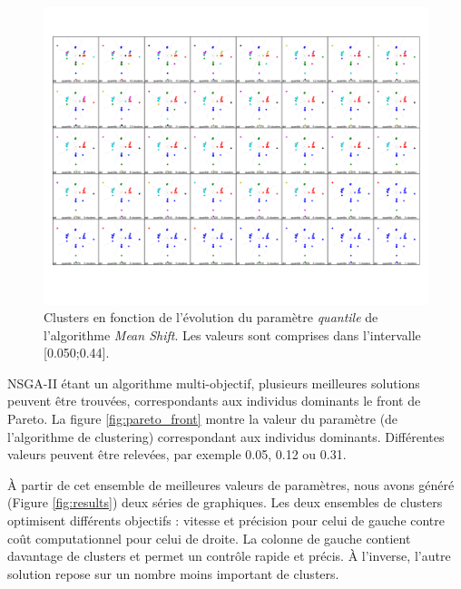 \documentclass{llncs}
\begin{document}
\begin{figure}[ht]
  \begin{center}
  \includegraphics[width=\textwidth]{figures/DS2_MS.pdf}
    \caption{Clusters en fonction de l'évolution du paramètre \textit{quantile} de l'algorithme \textit{Mean Shift}. Les valeurs sont comprises dans l'intervalle [0.050;0.44].}
  \label{fig:validation}
  \end{center}
\end{figure}

NSGA-II étant un algorithme multi-objectif, plusieurs meilleures solutions peuvent être trouvées, correspondants aux individus dominants le front de Pareto. La figure \ref{fig:pareto_front} montre la valeur du paramètre (de l'algorithme de clustering) correspondant aux individus dominants. Différentes valeurs peuvent être relevées, par exemple 0.05, 0.12 ou 0.31.

\`A partir de cet ensemble de meilleures valeurs de paramètres, nous avons généré (Figure \ref{fig:results}) deux séries de graphiques. Les deux ensembles de clusters optimisent différents objectifs : vitesse et précision pour celui de gauche contre coût computationnel pour celui de droite. La colonne de gauche contient davantage de clusters et permet un contrôle rapide et précis. \`A l'inverse, l'autre solution repose sur un nombre moins important de clusters.
\end{document}
